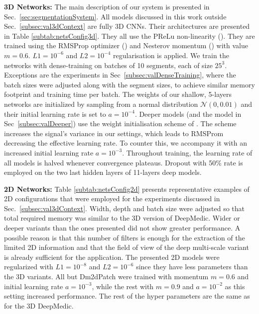 \textbf{3D Networks:} The main description of our system is presented in Sec.~\ref{sec:segmentationSystem}. All models discussed in this work outside Sec.~\ref{subsec:val3dContext} are fully 3D CNNs. Their architectures are presented in Table \ref{subtab:netsConfig3d}. They all use the PReLu non-linearity (\cite{he2015delving}). They are trained using the RMSProp optimizer (\cite{rmsProp}) and Nesterov momentum (\cite{sutskever2013importance}) with value $m=0.6$. $L1 = 10^{-6}$ and $L2 = 10^{-4}$ regularisation is applied. We train the networks with dense-training on batches of 10 segments, each of size $25^3$. Exceptions are the experiments in Sec~\ref{subsec:valDenseTraining}, where the batch sizes were adjusted along with the segment sizes, to achieve similar memory footprint and training time per batch. The weights of our shallow, 5-layers networks are initialized by sampling from a normal distribution $\mathcal{N}(0,0.01)$ and their initial learning rate is set to $a=10^{-4}$. Deeper models (and the  model in Sec~\ref{subsec:valDeeper}) use the weight initialisation scheme of \cite{he2015delving}. The scheme increases the signal's variance in our settings, which leads to RMSProm decreasing the effective learning rate. To counter this, we accompany it with an increased initial learning rate $a = 10^{-3}$. Throughout training, the learning rate of all models is halved whenever convergence plateaus. Dropout with 50\% rate is employed on the two last hidden layers of 11-layers deep models.

\textbf{2D Networks:} Table \ref{subtab:netsConfig2d} presents representative examples of 2D configurations that were employed for the experiments discussed in Sec.~\ref{subsec:val3dContext}. Width, depth and batch size were adjusted so that total required memory was similar to the 3D version of DeepMedic. Wider or deeper variants than the ones presented did not show greater performance. A possible reason is that this number of filters is enough for the extraction of the limited 2D information and that the field of view of the deep multi-scale variant is already sufficient for the application. The presented 2D models were regularized with $L1 = 10^{-8}$ and $L2 = 10^{-6}$ since they have less parameters than the 3D variants. All but Dm2dPatch were trained with momentum $m=0.6$ and initial learning rate $a = 10^{-3}$, while the rest with $m=0.9$ and $a = 10^{-2}$ as this setting increased performance. The rest of the hyper parameters are the same as for the 3D DeepMedic.

\setcounter{table}{0}    
\renewcommand\thetable{B.\arabic{table}}

